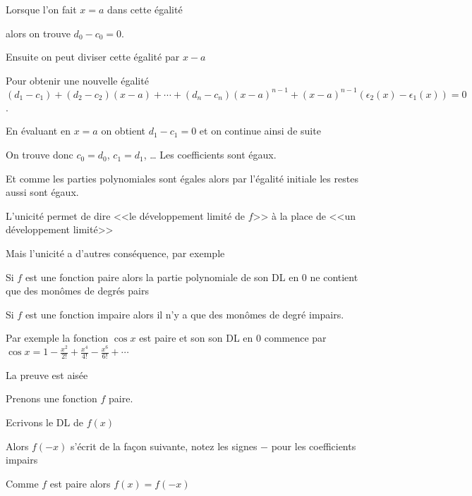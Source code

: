 \change

Lorsque l'on fait $x=a$ dans cette égalité 

\change

alors on trouve $d_0-c_0=0$.

\change

Ensuite on peut diviser cette égalité par $x-a$  

\change

Pour obtenir une nouvelle égalité 
$(d_1-c_1)+(d_2-c_2)(x-a)+\cdots+(d_n-c_n)(x-a)^{n-1}+(x-a)^{n-1}(\epsilon_2(x)-\epsilon_1(x))=0$.

\change 

En évaluant en $x=a$ on obtient $d_1-c_1=0$ et on continue ainsi de suite

\change

On trouve donc $c_0=d_0$, $c_1=d_1$, \ldots
Les coefficients sont égaux.

\change

Et comme les parties polynomiales sont égales alors par l'égalité initiale les restes aussi sont égaux.


\diapo

L'unicité permet de dire <<le développement limité de $f$>>
à la place de <<un développement limité>>

Mais l'unicité a d'autres conséquence, par exemple 

Si $f$ est une fonction paire alors la partie polynomiale de son DL en $0$
ne contient que des monômes de degrés pairs   


Si $f$ est une fonction impaire alors il n'y a que des monômes de degré impairs.

\change

Par exemple la fonction $\cos x$ est paire et son son DL en $0$ commence par 
$\cos x=1-\frac{x^2}{2!}+\frac{x^4}{4!}-\frac{x^6}{6!}+\cdots$

\change

La preuve est aisée 

Prenons une fonction $f$ paire.

Ecrivons le DL de $f(x)$

\change

Alors  $f(-x)$ s'écrit de la façon suivante,
notez les signes $-$ pour les coefficients impairs

\change

Comme $f$ est paire alors $f(x)=f(-x)$ 

\change


